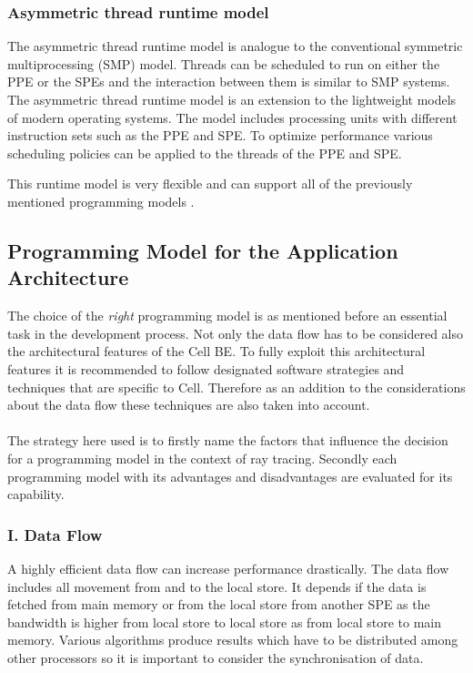 \documentclass[DIV10, abstracton, openright, footsepline, headsepline, twoside, 9pt,
bigheadings]{scrreprt}
\begin{document}
\subsubsection*{Asymmetric thread runtime model}
The asymmetric thread runtime model is analogue to the conventional symmetric
multiprocessing (SMP) model.
Threads can be scheduled to run on either the PPE or the SPEs and the
interaction between them is similar to SMP systems. The asymmetric thread
runtime model is an extension to the lightweight models of modern operating
systems. The model includes processing units with different instruction sets
such as the PPE and SPE.
To optimize performance various scheduling policies can be applied to the
threads of the PPE and SPE.

This runtime model is very flexible and can support all of the previously
mentioned programming models \cite{Kahle05}.

\subsection{Programming Model for the Application Architecture}
\label{sec:programming_model}
The choice of the \textit{right} programming model is as mentioned before an
essential task in the development process. Not only the data flow has to be
considered also the architectural features of the Cell BE. To fully exploit this
architectural features it is recommended  to follow designated software strategies
and techniques that are specific to Cell.  Therefore as an addition to the
considerations about the data flow these techniques are also taken into account.\\\\


The strategy here used is to firstly name the factors that influence the decision
for a programming model in the context of ray tracing. Secondly each programming
model with its advantages and disadvantages are evaluated for its capability.

\subsubsection*{I. Data Flow}
\label{sec:data_flow}

A highly efficient data flow can increase performance drastically. The data flow
includes all movement from and to the local store. It depends if the data is fetched
from main memory or from the local store from another SPE as the bandwidth is higher
from local store to local store as from local store to main memory. Various algorithms
produce results which have to be  distributed among other processors so it is
important to consider the synchronisation of data.
\end{document}

